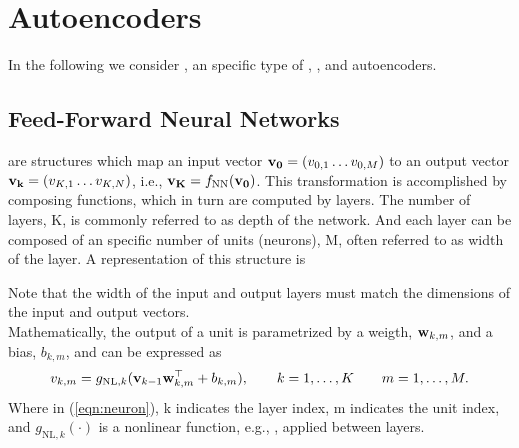 	
\section{Autoencoders}
In the following we consider , an specific type of , , and autoencoders.

\subsection{Feed-Forward Neural Networks}
 are structures which map an input vector $\bold{v_0} = (v_{0,1} \dots v_{0,M})$ to an output vector $\bold{v_k} = (v_{K,1} \dots v_{K,N})$, i.e., $\bold{v_K}=f_{\text{NN}}(\bold{v_0})$. This transformation is accomplished by composing functions, which in turn are computed by layers. The number of layers, K, is commonly referred to as depth of the network. And each layer can be composed of an specific number of units (neurons), M, often referred to as width of the layer. A representation of this structure is

\begin{figure}[H]
	\centering
	
\end{figure}


Note that the width of the input and output layers must match the dimensions of the input and output vectors.\\
Mathematically, the output of a unit is parametrized by a weigth, $\bold{w}_{k,m}$, and a bias, $b_{k,m}$, and can be expressed as
\begin{align}
	v_{k,m} = g_{\text{NL},k}(\vb{v}_{k-1}\vb{w}^\top_{k,m} + b_{k,m}), \qquad k = 1, \dots, K \qquad m = 1, \dots, M.
	\label{eqn:neuron}
\end{align}
Where in (\ref{eqn:neuron}), k indicates the layer index, m indicates the unit index, and $g_{\text{NL},k}(\cdot)$ is a nonlinear function, e.g., , applied between layers.

